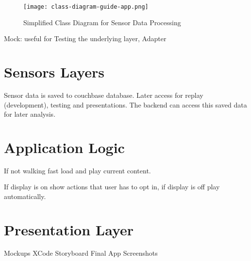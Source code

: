 \begin{figure}[H]
\centering
\texttt{[image: class-diagram-guide-app.png]}
\caption{Simplified Class Diagram for Sensor Data Processing}
\end{figure}

Mock: useful for Testing the underlying layer,
Adapter


\section{Sensors Layers}

Sensor data is saved to couchbase database.
Later access for replay (development), testing and presentations.
The backend can access this saved data for later analysis.

\section{Application Logic}

If not walking fast load and play current content.

If display is on show actions that user has to opt in, if display is off play automatically. 

\section{Presentation Layer}

Mockups
XCode Storyboard
Final App Screenshots